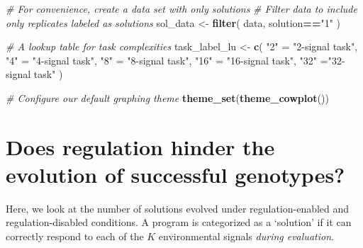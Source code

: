 \documentclass[
]{book}
\newenvironment{Shaded}{\begin{snugshade}}{\end{snugshade}}
\newcommand{\CommentTok}[1]{\textcolor[rgb]{0.56,0.35,0.01}{\textit{#1}}}
\newcommand{\KeywordTok}[1]{\textcolor[rgb]{0.13,0.29,0.53}{\textbf{#1}}}
\newcommand{\NormalTok}[1]{#1}
\newcommand{\OperatorTok}[1]{\textcolor[rgb]{0.81,0.36,0.00}{\textbf{#1}}}
\newcommand{\StringTok}[1]{\textcolor[rgb]{0.31,0.60,0.02}{#1}}
\begin{document}
\begin{Shaded}
\begin{Highlighting}[]
\CommentTok{\# For convenience, create a data set with only solutions}
\CommentTok{\# Filter data to include only replicates labeled as solutions}
\NormalTok{sol\_data \textless{}{-}}\StringTok{ }\KeywordTok{filter}\NormalTok{(}
\NormalTok{  data,}
\NormalTok{  solution}\OperatorTok{==}\StringTok{"1"}
\NormalTok{)}

\CommentTok{\# A lookup table for task complexities}
\NormalTok{task\_label\_lu \textless{}{-}}\StringTok{ }\KeywordTok{c}\NormalTok{(}
  \StringTok{"2"}\NormalTok{ =}\StringTok{ "2{-}signal task"}\NormalTok{,}
  \StringTok{"4"}\NormalTok{ =}\StringTok{ "4{-}signal task"}\NormalTok{,}
  \StringTok{"8"}\NormalTok{ =}\StringTok{ "8{-}signal task"}\NormalTok{,}
  \StringTok{"16"}\NormalTok{ =}\StringTok{ "16{-}signal task"}\NormalTok{,}
  \StringTok{"32"}\NormalTok{ =}\StringTok{"32{-}signal task"}
\NormalTok{)}

\CommentTok{\# Configure our default graphing theme}
\KeywordTok{theme\_set}\NormalTok{(}\KeywordTok{theme\_cowplot}\NormalTok{())}
\end{Highlighting}
\end{Shaded}

\hypertarget{does-regulation-hinder-the-evolution-of-successful-genotypes}{%
\section{Does regulation hinder the evolution of successful genotypes?}\label{does-regulation-hinder-the-evolution-of-successful-genotypes}}

Here, we look at the number of solutions evolved under regulation-enabled and regulation-disabled conditions.
A program is categorized as a `solution' if it can correctly respond to each of the \(K\) environmental signals \emph{during evaluation}.
\end{document}
